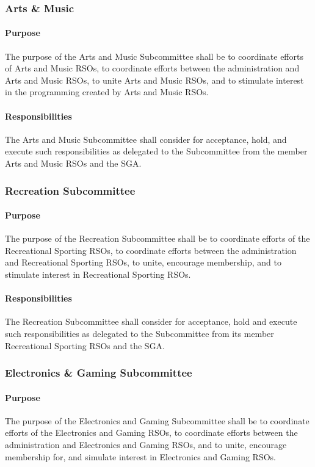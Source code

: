 \documentclass[12pt]{scrreprt}
\begin{document}
\subsubsection{Arts \& Music}

\paragraph{Purpose}
The purpose of the Arts and Music Subcommittee shall be to coordinate efforts
of Arts and Music RSOs, to coordinate efforts between the administration and Arts and
Music RSOs, to unite Arts and Music RSOs, and to stimulate interest in the programming
created by Arts and Music RSOs.

\paragraph{Responsibilities}
​The Arts and Music Subcommittee shall consider for acceptance, hold,
and execute such responsibilities as delegated to the Subcommittee from the member Arts
and Music RSOs and the SGA.

\subsubsection{Recreation Subcommittee}

\paragraph{Purpose}
​The purpose of the Recreation Subcommittee shall be to coordinate efforts of
the Recreational Sporting RSOs, to coordinate efforts between the administration and
Recreational Sporting RSOs, to unite, encourage membership, and to stimulate interest in
Recreational Sporting RSOs.

\paragraph{Responsibilities}
​The Recreation Subcommittee shall consider for acceptance, hold and
execute such responsibilities as delegated to the Subcommittee from its member
Recreational Sporting RSOs and the SGA.

\subsubsection{Electronics \& Gaming Subcommittee}
\paragraph{Purpose}
​The purpose of the Electronics and Gaming Subcommittee shall be to
coordinate efforts of the Electronics and Gaming RSOs, to coordinate efforts between the
administration and Electronics and Gaming RSOs, and to unite, encourage membership for,
and simulate interest in Electronics and Gaming RSOs.
\end{document}
